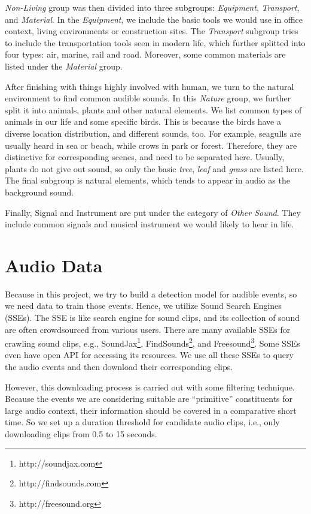 \textit{Non-Living} group was then divided into three subgroups: \textit{Equipment}, \textit{Transport}, and \textit{Material}. 
In the \textit{Equipment}, we include the basic tools we would use in office context, living environments or construction sites. 
The \textit{Transport} subgroup tries to include the transportation tools seen in modern life, which further splitted into four types: air, marine, rail and road. 
Moreover, some common materials are listed under the \textit{Material} group. 

After finishing with things highly involved with human, we turn to the natural environment to find common audible sounds. 
In this \textit{Nature} group, we further split it into animals, plants and other natural elements. 
We list common types of animals in our life and some specific birds. 
This is because the birds have a diverse location distribution, and different sounds, too. 
For example, seagulls are usually heard in sea or beach, while crows in park or forest. 
Therefore, they are distinctive for corresponding scenes, and need to be separated here. 
Usually, plants do not give out sound, so only the basic \textit{tree}, \textit{leaf} and \textit{grass} are listed here. 
The final subgroup is natural elements, which tends to appear in audio as the background sound.  

Finally, Signal and Instrument are put under the category of \textit{Other Sound}. 
They include common signals and musical instrument we would likely to hear in life. 


\section{Audio Data}
Because in this project, we try to build a detection model for audible events, so we need data to train those events. 
Hence, we utilize Sound Search Engines (SSEs). 
The SSE is like search engine for sound clips, and its collection of sound are often crowdsourced from various users. 
There are many available SSEs for crawling sound clips, e.g., SoundJax\footnote{http://soundjax.com}, FindSounds\footnote{http://findsounds.com}, and Freesound\footnote{http://freesound.org}. 
Some SSEs even have open API for accessing its resources. 
We use all these SSEs to query the audio events and then download their corresponding clips. 

However, this downloading process is carried out with some filtering technique. 
Because the events we are considering suitable are ``primitive'' constituents for large audio context, their information should be covered in a comparative short time. 
So we set up a duration threshold for candidate audio clips, i.e., only downloading clips from 0.5 to 15 seconds.  

